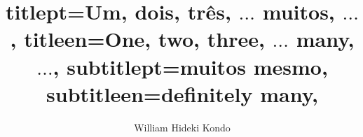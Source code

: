 

\title{
    titlept={Um, dois, três, $\dots$ muitos, $\dots$},
    titleen={One, two, three, $\dots$ many, $\dots$},
    subtitlept={muitos mesmo},
    subtitleen={definitely many},
}

\author{William Hideki Kondo}

